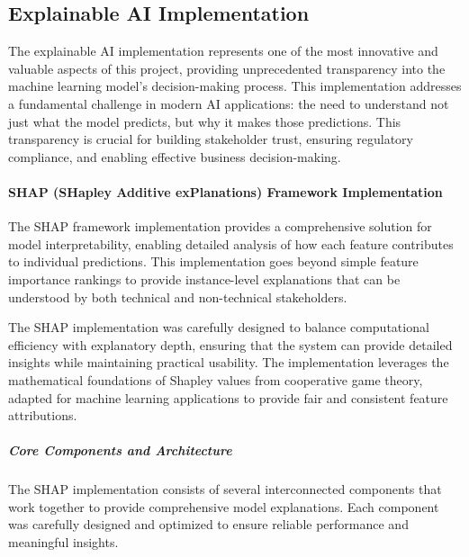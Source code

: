 \documentclass{article}
\begin{document}
\subsection{Explainable AI Implementation}

The explainable AI implementation represents one of the most innovative and valuable aspects of this project, providing unprecedented transparency into the machine learning model's decision-making process. This implementation addresses a fundamental challenge in modern AI applications: the need to understand not just what the model predicts, but why it makes those predictions. This transparency is crucial for building stakeholder trust, ensuring regulatory compliance, and enabling effective business decision-making.

\paragraph{SHAP (SHapley Additive exPlanations) Framework Implementation}

The SHAP framework implementation provides a comprehensive solution for model interpretability, enabling detailed analysis of how each feature contributes to individual predictions. This implementation goes beyond simple feature importance rankings to provide instance-level explanations that can be understood by both technical and non-technical stakeholders.

The SHAP implementation was carefully designed to balance computational efficiency with explanatory depth, ensuring that the system can provide detailed insights while maintaining practical usability. The implementation leverages the mathematical foundations of Shapley values from cooperative game theory, adapted for machine learning applications to provide fair and consistent feature attributions.

\subparagraph{Core Components and Architecture}

The SHAP implementation consists of several interconnected components that work together to provide comprehensive model explanations. Each component was carefully designed and optimized to ensure reliable performance and meaningful insights.
\end{document}
